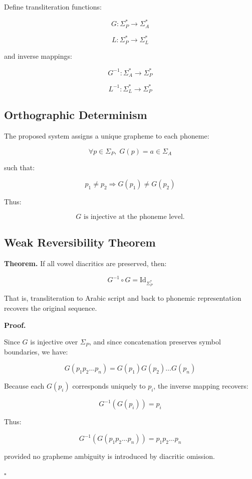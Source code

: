 \documentclass[12pt]{article}
\begin{document}
Define transliteration functions:

\[
G : \Sigma_P^* \rightarrow \Sigma_A^*
\]

\[
L : \Sigma_P^* \rightarrow \Sigma_L^*
\]

and inverse mappings:

\[
G^{-1} : \Sigma_A^* \rightarrow \Sigma_P^*
\]

\[
L^{-1} : \Sigma_L^* \rightarrow \Sigma_P^*
\]

\subsection{Orthographic Determinism}

The proposed system assigns a unique grapheme to each phoneme:

\[
\forall p \in \Sigma_P,\; G(p) = a \in \Sigma_A
\]

such that:

\[
p_1 \neq p_2 \Rightarrow G(p_1) \neq G(p_2)
\]

Thus:

\[
G \text{ is injective at the phoneme level.}
\]

\subsection{Weak Reversibility Theorem}

\textbf{Theorem.}  
If all vowel diacritics are preserved, then:

\[
G^{-1} \circ G = \mathrm{Id}_{\Sigma_P^*}
\]

That is, transliteration to Arabic script and back to phonemic representation recovers the original sequence.

\textbf{Proof.}

Since \( G \) is injective over \( \Sigma_P \), and since concatenation preserves symbol boundaries, we have:

\[
G(p_1 p_2 \dots p_n) = G(p_1)G(p_2)\dots G(p_n)
\]

Because each \( G(p_i) \) corresponds uniquely to \( p_i \), the inverse mapping recovers:

\[
G^{-1}(G(p_i)) = p_i
\]

Thus:

\[
G^{-1}(G(p_1 p_2 \dots p_n)) = p_1 p_2 \dots p_n
\]

provided no grapheme ambiguity is introduced by diacritic omission.

\hfill \( \square \)
\end{document}
